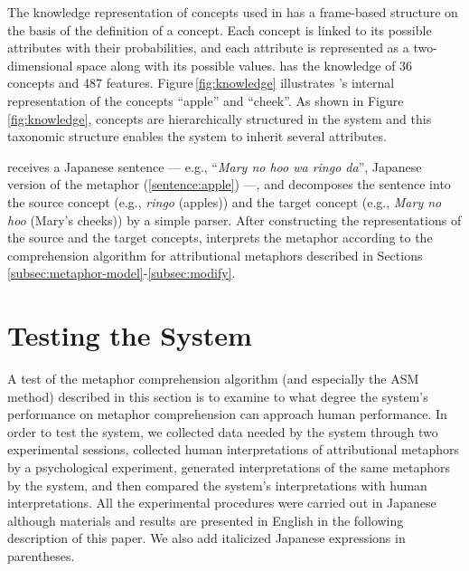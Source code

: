 The knowledge representation of concepts used in \SNAME\/ has a
frame-based structure on the basis of the definition of a concept.
Each concept is linked to its possible attributes with their
probabilities, and each attribute is represented as a two-dimensional
space along with its possible values. 
\SNAME\/ has the knowledge of 36 concepts and 487 features.
Figure\,\ref{fig:knowledge} illustrates
\SNAME's internal representation of the concepts ``apple'' and
``cheek''. As shown in Figure\,\ref{fig:knowledge},
concepts are hierarchically structured in the \SNAME\/ system and 
this taxonomic structure enables the system to inherit several attributes.

\SNAME\/ receives a Japanese sentence
--- e.g., ``{\it Mary no hoo wa ringo da}'',
Japanese version of the metaphor (\ref{sentence:apple}) ---,
and decomposes the sentence into the source concept 
(e.g., {\it ringo} (apples)) and the target concept 
(e.g., {\it Mary no hoo} (Mary's cheeks)) 
by a simple parser.
After constructing the representations of the source and the target
concepts, \SNAME\/ interprets the metaphor according to the
comprehension algorithm for attributional metaphors described in
Sections\,\ref{subsec:metaphor-model}-\ref{subsec:modify}. 

\section{Testing the System} \label{sec:psycho}
A test of the metaphor comprehension algorithm (and especially the ASM method)
described in this section is to examine to what degree the system's performance 
on metaphor comprehension can approach human performance.
In order to test the system, we collected data needed by the \SNAME\/ system 
through two experimental sessions, collected human interpretations of 
attributional metaphors by a psychological experiment, generated interpretations
of the same metaphors by the \SNAME\/ system, 
and then compared the system's interpretations with human interpretations.
All the experimental procedures were carried out in Japanese 
although materials and results are presented in English in the
following description of this paper.
We also add italicized Japanese expressions in parentheses.

